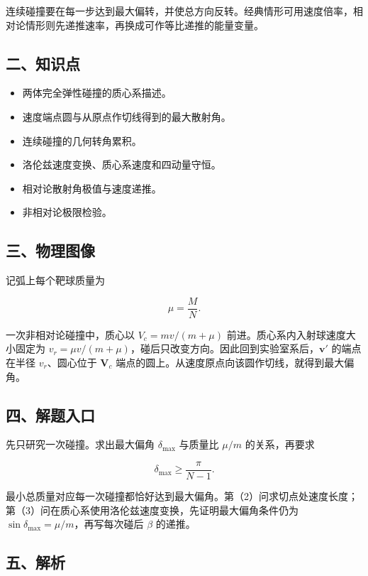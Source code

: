 \documentclass[12pt,a4paper,UTF8]{ctexart}
\newcommand{\tightlist}{\setlength{\itemsep}{0pt}\setlength{\parskip}{0pt}}
\begin{document}
连续碰撞要在每一步达到最大偏转，并使总方向反转。经典情形可用速度倍率，相对论情形则先递推速率，再换成可作等比递推的能量变量。

\subsection{二、知识点}\label{ux4e8cux77e5ux8bc6ux70b9-7}

\begin{itemize}
\tightlist
\item
  两体完全弹性碰撞的质心系描述。
\item
  速度端点圆与从原点作切线得到的最大散射角。
\item
  连续碰撞的几何转角累积。
\item
  洛伦兹速度变换、质心系速度和四动量守恒。
\item
  相对论散射角极值与速度递推。
\item
  非相对论极限检验。
\end{itemize}

\subsection{三、物理图像}\label{ux4e09ux7269ux7406ux56feux50cf-7}

记弧上每个靶球质量为

\[\mu=\frac MN.\]

一次非相对论碰撞中，质心以 \(V_c=mv/(m+\mu)\)
前进。质心系内入射球速度大小固定为
\(v_r=\mu v/(m+\mu)\)，碰后只改变方向。因此回到实验室系后，\(\bm v'\)
的端点在半径 \(v_r\)、圆心位于 \(\bm V_c\)
端点的圆上。从速度原点向该圆作切线，就得到最大偏角。

\subsection{四、解题入口}\label{ux56dbux89e3ux9898ux5165ux53e3-7}

先只研究一次碰撞。求出最大偏角 \(\delta_{\max}\) 与质量比 \(\mu/m\)
的关系，再要求

\[\delta_{\max}\geq\frac{\pi}{N-1}.\]

最小总质量对应每一次碰撞都恰好达到最大偏角。第（2）问求切点处速度长度；第（3）问在质心系使用洛伦兹速度变换，先证明最大偏角条件仍为
\(\sin\delta_{\max}=\mu/m\)，再写每次碰后 \(\beta\) 的递推。

\subsection{五、解析}\label{ux4e94ux89e3ux6790-7}
\end{document}
